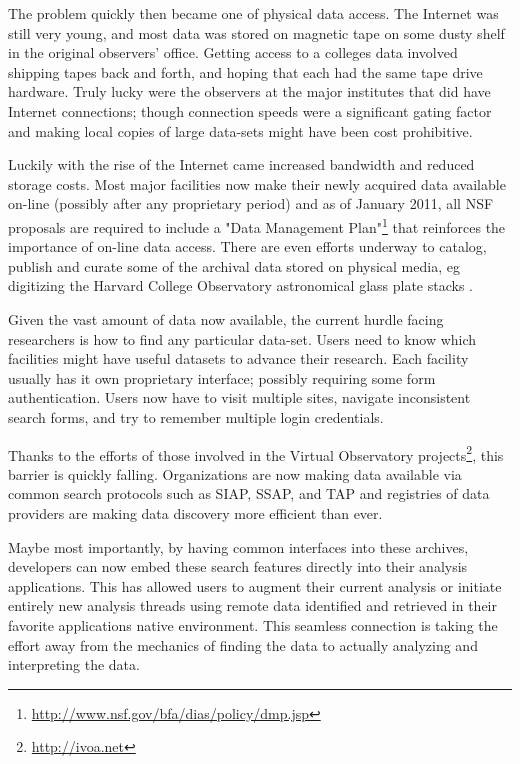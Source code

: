 The problem quickly then became one of physical data access.  The Internet
was still very young, and most data was stored on magnetic tape on
some dusty shelf in the original observers' office.  Getting access
to a colleges data involved shipping tapes back and forth, and
hoping that each had the same tape drive hardware.  Truly lucky were the
observers at the major institutes that did have Internet connections;
though connection speeds were a significant gating factor and making
local copies of large data-sets might have been cost prohibitive.

Luckily with the rise of the Internet came increased bandwidth and
reduced storage costs.  Most major facilities now make their newly
acquired data available on-line (possibly after any proprietary period)
and as of January 2011, all NSF proposals are required to include a "Data
Management Plan"\footnote{ \url{http://www.nsf.gov/bfa/dias/policy/dmp.jsp}}
 that reinforces the importance of on-line data access.
There are even efforts underway to catalog, publish and curate some of
the archival data stored on physical media, eg digitizing the Harvard
College Observatory astronomical glass plate stacks \citep{2006vopc.conf...54M}.

Given the vast amount of data now available, the current hurdle facing
researchers is how to find any particular data-set.  Users need to know
which facilities might have useful datasets to advance their research.
Each facility usually has it own proprietary interface; possibly
requiring some form authentication.  Users now have to visit multiple
sites,  navigate inconsistent search forms, and try to remember multiple
login credentials.

Thanks to the efforts of those involved in the Virtual Observatory
projects\footnote{ \url{http://ivoa.net}}, this barrier is quickly falling.  Organizations are now making
data available via common search protocols such as SIAP, SSAP, and TAP and  registries of data providers are making data discovery more
efficient than ever.

Maybe most importantly, by having common interfaces into these archives,
developers can now embed these search features directly into their
analysis applications.  This has allowed users to augment their current
analysis or initiate entirely new analysis threads using remote data 
identified and retrieved in 
their favorite applications native environment.  This seamless connection
is taking the effort away from the mechanics of finding the data to
actually analyzing and interpreting the data.

